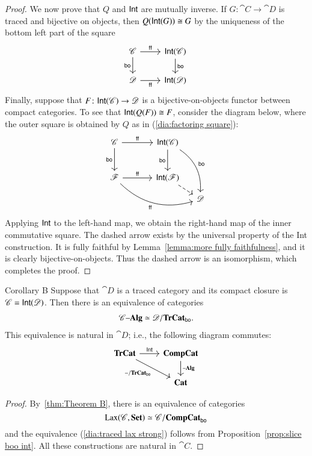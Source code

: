 \documentclass[12pt,oneside,article,draft]{memoir}
\begin{document}
\begin{enumerate}
\begin{proof}
	We now prove that $Q$ and $\mathsf{Int}$ are mutually inverse.
	If $G\colon\cat{C}\to\cat{D}$ is traced and bijective on objects, then $Q(\mathsf{Int}(G))\cong G$ by the uniqueness of the bottom left part of the square
	$$
	\begin{tikzcd}
	\cat{C}\arrow[r,"\ff"]\arrow[d,"\bo"']&\Int(\cat{C})\arrow[d,"\bo"]\\
	\cat{D}\arrow[r,"\ff"']&\Int(\cat{D})
	\end{tikzcd}
	$$
	Finally, suppose that $F\colon\mathsf{Int}(\mathscr{C})\to\mathscr{D}$ is a bijective-on-objects functor between compact categories.
	To see that $\mathsf{Int}(Q(F))\cong F$, consider the diagram below, where the outer square is obtained by $Q$ as in (\ref{dia:factoring square}):
	$$
	\begin{tikzcd}[column sep=small, row sep=small]
		\cat{C}\arrow[rr,"\ff"]\arrow[dd,"\bo"']
			&~
			&\Int(\cat{C})\arrow[dd,"\bo"']\arrow[dddr,bend left,"\bo"] \\
		~ \\
		\cat{F}\arrow[rr,"\ff"]\arrow[drrr,bend right, "\ff"']
			&&\Int(\cat{F})\arrow[dr,dashed] \\
		&&&\cat{D}
	\end{tikzcd}
	$$
	Applying $\mathsf{Int}$ to the left-hand map, we obtain the right-hand map of the inner commutative square.
	The dashed arrow exists by the universal property of the Int construction.
	It is fully faithful by Lemma~\ref{lemma:more fully faithfulness}, and it is clearly bijective-on-objects.
	Thus the dashed arrow is an isomorphism, which completes the proof.
\end{proof}

\begin{named}{Corollary B}\label{cor:Corollary B}
	Suppose that $\cat{D}$ is a traced category and its compact closure is $\mathscr{C}=\mathsf{Int}(\mathscr{D})$.
	Then there is an equivalence of categories
	\begin{align}\label{dia:traced lax strong}
		\mathscr{C}{\text \textendash}\mathbf{Alg}\simeq\mathscr{D}/\mathbf{TrCat}_{\mathsf{bo}}.
	\end{align}
	This equivalence is natural in $\cat{D}$; i.e., the following diagram commutes:
	\begin{equation*}
	\begin{tikzcd}
		\TrCat\ar[r,"\Fun{Int}"]\ar[dr,"-/\TrCat_{\bo}"']
			&\CompCat\ar[d,"\alg"] \\
		&\Cat{Cat}
	\end{tikzcd}
	\end{equation*}
\end{named}
\begin{proof}
	By~\ref{thm:Theorem B}, there is an equivalence of categories 
		$$\operatorname{Lax}(\mathscr{C},\mathbf{Set})\simeq\mathscr{C}/\mathbf{CompCat}_{\mathsf{bo}}$$
	and the equivalence (\ref{dia:traced lax strong}) follows from Proposition~\ref{prop:slice boo int}.
	All these constructions are natural in $\cat{C}$.
\end{proof}


\end{enumerate}
\end{document}
